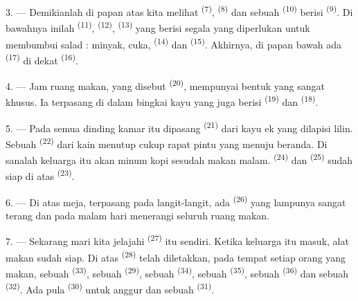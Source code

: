 3. --- Demikianlah di papan atas kita melihat 
\textsuperscript{(7)},  \textsuperscript{(8)} dan sebuah
 \textsuperscript{(10)} berisi 
\textsuperscript{(9)}. Di bawahnya inilah 
\textsuperscript{(11)},  \textsuperscript{(12)},
 \textsuperscript{(13)} yang berisi segala
yang diperlukan untuk membumbui salad : minyak, cuka, 
\textsuperscript{(14)} dan  \textsuperscript{(15)}.
Akhirnya, di papan bawah ada  \textsuperscript{(17)} di
dekat  \textsuperscript{(16)}.

4. --- Jam ruang makan, yang disebut 
\textsuperscript{(20)}, mempunyai bentuk yang sangat khusus. Ia
terpasang di dalam bingkai kayu yang juga berisi 
\textsuperscript{(19)} dan  \textsuperscript{(18)}.

\VUsaut{4.6mm}
\VUsaut{3.0mm}

5. --- Pada semua dinding kamar itu dipasang 
\textsuperscript{(21)} dari kayu ek yang dilapisi lilin. Sebuah
 \textsuperscript{(22)} dari kain menutup cukup
rapat pintu yang menuju beranda. Di sanalah keluarga itu akan minum
kopi sesudah makan malam. 
\textsuperscript{(24)} dan  \textsuperscript{(25)}
sudah siap di atas  \textsuperscript{(23)}.

6. --- Di atas meja, terpasang pada langit-langit, ada  \textsuperscript{(26)} yang lampunya sangat terang dan pada
malam hari menerangi seluruh ruang makan.

7. --- Sekarang mari kita jelajahi 
\textsuperscript{(27)} itu sendiri. Ketika keluarga itu masuk, alat
makan sudah siap. Di atas  \textsuperscript{(28)}
telah diletakkan, pada tempat setiap orang yang makan, sebuah
 \textsuperscript{(33)}, sebuah 
\textsuperscript{(29)}, sebuah  \textsuperscript{(34)},
sebuah  \textsuperscript{(35)}, sebuah 
\textsuperscript{(36)} dan sebuah  \textsuperscript{(32)}.
Ada pula  \textsuperscript{(30)} untuk anggur dan
sebuah  \textsuperscript{(31)}.


